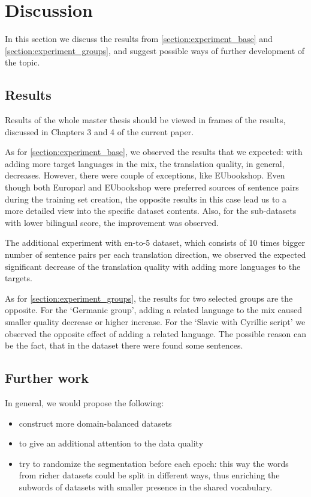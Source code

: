 \chapter{Discussion}
\label{chapter:discussion}

In this section we discuss the results from \cref{section:experiment_base}
and \cref{section:experiment_groups}, and suggest possible ways of further development of the topic.

\section{Results}
\label{section:results}



Results of the whole master thesis should be viewed in frames of the results, discussed in Chapters 3 and 4 of the current paper.


As for \cref{section:experiment_base}, we observed the results that we expected:
with adding more target languages in the mix, the translation quality, in general, decreases.
However, there were couple of exceptions, like EUbookshop.
Even though both Europarl and EUbookshop were preferred sources of sentence pairs
during the training set creation, the opposite results in this case lead us to
a more detailed view into the specific dataset contents.
Also, for the sub-datasets with lower bilingual score, the improvement was observed.

The additional experiment with en-to-5 dataset, which consists of 10 times bigger number
of sentence pairs per each translation direction, we observed the expected significant decrease
of the translation quality with adding more languages to the targets.

As for \cref{section:experiment_groups}, the results for two selected groups are
the opposite. For the `Germanic group', adding a related language to the mix caused
smaller quality decrease or higher increase. 
For the `Slavic with Cyrillic script' we observed the opposite effect of adding a related language.
The possible reason can be the fact, that in the  dataset there were found
some  sentences.


\section{Further work}
\label{section:further_work}

In general, we would propose the following:
\begin{itemize}
    \item construct more domain-balanced datasets
    \item to give an additional attention to the data quality
    \item try to randomize the segmentation before each epoch: this way the words
    from richer datasets could be split in different ways, thus enriching the subwords of
    datasets with smaller presence in the shared vocabulary.
\end{itemize}